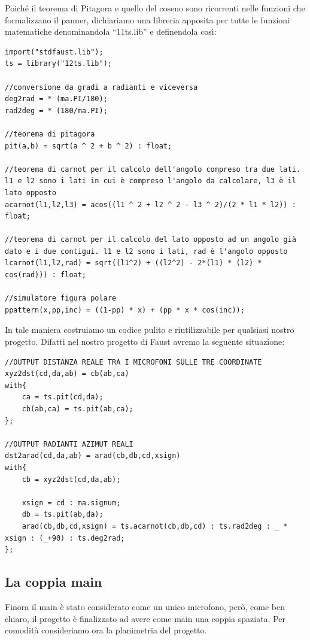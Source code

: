 \documentclass{article}
\begin{document}
    Poiché il teorema di Pitagora e quello del coseno sono ricorrenti nelle funzioni che formalizzano il panner, dichiariamo una libreria apposita per tutte le funzioni matematiche denominandola ``11ts.lib'' e definendola così:
    
    \begin{lstlisting}
import("stdfaust.lib");
ts = library("12ts.lib");

//conversione da gradi a radianti e viceversa
deg2rad = * (ma.PI/180);
rad2deg = * (180/ma.PI);

//teorema di pitagora
pit(a,b) = sqrt(a ^ 2 + b ^ 2) : float;

//teorema di carnot per il calcolo dell'angolo compreso tra due lati. l1 e l2 sono i lati in cui è compreso l'angolo da calcolare, l3 è il lato opposto
acarnot(l1,l2,l3) = acos((l1 ^ 2 + l2 ^ 2 - l3 ^ 2)/(2 * l1 * l2)) : float;

//teorema di carnot per il calcolo del lato opposto ad un angolo già dato e i due contigui. l1 e l2 sono i lati, rad è l'angolo opposto
lcarnot(l1,l2,rad) = sqrt((l1^2) + ((l2^2) - 2*(l1) * (l2) * cos(rad))) : float;

//simulatore figura polare
ppattern(x,pp,inc) = ((1-pp) * x) + (pp * x * cos(inc));
    \end{lstlisting}
    
    
    In tale maniera costruiamo un codice pulito e riutilizzabile per qualsiasi nostro progetto.
    Difatti nel nostro progetto di Faust avremo la seguente situazione:
    
    \begin{lstlisting}
//OUTPUT DISTANZA REALE TRA I MICROFONI SULLE TRE COORDINATE
xyz2dst(cd,da,ab) = cb(ab,ca)
with{
    ca = ts.pit(cd,da);
    cb(ab,ca) = ts.pit(ab,ca);
};

//OUTPUT RADIANTI AZIMUT REALI
dst2arad(cd,da,ab) = arad(cb,db,cd,xsign)
with{
    cb = xyz2dst(cd,da,ab);

    xsign = cd : ma.signum;
    db = ts.pit(ab,da);
    arad(cb,db,cd,xsign) = ts.acarnot(cb,db,cd) : ts.rad2deg : _ * xsign : (_+90) : ts.deg2rad;
};
    \end{lstlisting}

    \subsection{La coppia main}
    
    Finora il main è stato considerato come un unico microfono, però, come ben chiaro, il progetto è finalizzato ad avere come main una coppia spaziata. Per comodità consideriamo ora la planimetria del progetto.
\end{document}
